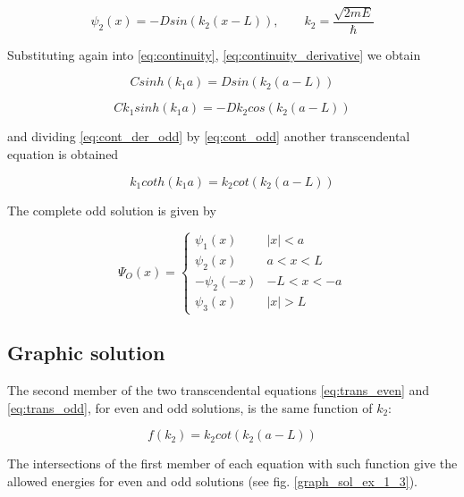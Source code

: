 \documentclass{article}
\begin{document}
\begin{equation}
\psi_{2}(x) = - D sin(k_{2}(x-L)), \qquad k_{2} = \frac{\sqrt{2mE}}{\hbar}
\end{equation}

Substituting again into \eqref{eq:continuity}, \eqref{eq:continuity_derivative} we obtain

\begin{equation}
\label{eq:cont_odd}
C sinh(k_{1}a) =  D sin(k_{2}(a-L))
\end{equation}

\begin{equation}
\label{eq:cont_der_odd}
C k_{1} sinh(k_{1}a) =  - D k_{2} cos(k_{2}(a-L))
\end{equation}

and dividing \eqref{eq:cont_der_odd} by \eqref{eq:cont_odd} another transcendental equation is obtained

\begin{equation}
\label{eq:trans_odd}
k_{1} coth(k_{1}a) = k_{2} cot(k_{2}(a-L))
\end{equation}

The complete odd solution is given by

\begin{equation}
\Psi_{O}(x) = 
  \begin{cases} 
      \psi_{1}(x) & \left|x\right| < a \\
      \psi_{2}(x) & a < x < L \\
      -\psi_{2}(-x) & -L < x < -a \\
      \psi_{3}(x) & \left|x\right| > L
   \end{cases}
\end{equation}

\subsection{Graphic solution}
The second member of the two transcendental equations \eqref{eq:trans_even} and \eqref{eq:trans_odd}, for even and odd solutions, is the same function of \(k_{2}\):

\begin{equation}
f(k_{2}) = k_{2} cot(k_{2}(a-L))
\end{equation}

The intersections of the first member of each equation with such function give the allowed energies for even and odd solutions (see fig. \ref{graph_sol_ex_1_3}).
\end{document}
